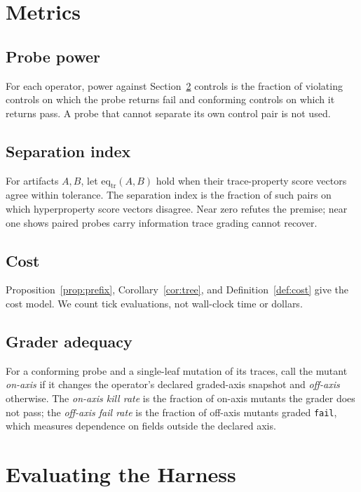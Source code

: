 \documentclass[conference]{IEEEtran}
\begin{document}
	\section{Metrics}
	\label{sec:metrics}
	
	\subsection{Probe power}
	
	For each operator, power against Section~\ref{sec:protocol} controls is the
	fraction of violating controls on which the probe returns fail and conforming
	controls on which it returns pass. A probe that cannot separate its own
	control pair is not used.
	
	\subsection{Separation index}
	
	For artifacts $A,B$, let $\mathrm{eq}_{\mathrm{tr}}(A,B)$ hold when their
	trace-property score vectors agree within tolerance. The separation index is
	the fraction of such pairs on which hyperproperty score vectors disagree.
	Near zero refutes the premise; near one shows paired probes carry information
	trace grading cannot recover.
	
	\subsection{Cost}
	
	Proposition~\ref{prop:prefix}, Corollary~\ref{cor:tree}, and
	Definition~\ref{def:cost} give the cost model. We count tick evaluations,
	not wall-clock time or dollars.

	\subsection{Grader adequacy}
	\label{sec:adequacy-metric}

	For a conforming probe and a single-leaf mutation of its traces, call the
	mutant \emph{on-axis} if it changes the operator's declared graded-axis
	snapshot and \emph{off-axis} otherwise. The \emph{on-axis kill rate} is the
	fraction of on-axis mutants the grader does not pass; the \emph{off-axis
	fail rate} is the fraction of off-axis mutants graded \texttt{fail}, which
	measures dependence on fields outside the declared axis.
	
	\section{Evaluating the Harness}
	\label{sec:protocol}
	
\end{document}
